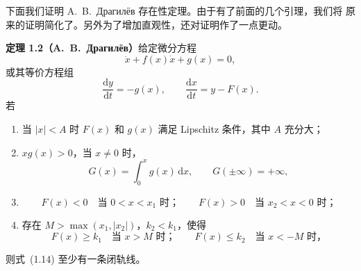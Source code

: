 下面我们证明 A.~B.~Драгилёв 存在性定理。由于有了前面的几个引理，我们将
原来的证明简化了。另外为了增加直观性，还对证明作了一点更动。

\noindent\textbf{定理 1.2（A.~B.~Драгилёв\cite{10}）}\quad 给定微分方程
\[
  \ddot{x}+f(x)\dot{x}+g(x)=0, \tag{1.13}
\]
或其等价方程组
\[
  \dfrac{\mathrm{d}y}{\mathrm{d}t}=-g(x),\qquad
  \dfrac{\mathrm{d}x}{\mathrm{d}t}=y-F(x). \tag{1.14}
\]
若
\begin{enumerate}
  \item 当 $|x|<A$ 时 $F(x)$ 和 $g(x)$ 满足 Lipschitz 条件，其中 $A$ 充分大；
  \item $xg(x)>0$，当 $x\ne0$ 时，
  \[
    G(x)=\int_0^xg(x)\,\mathrm{d}x,\qquad G(\pm\infty)=+\infty,
  \]
  \item
  \[
    F(x)<0\quad\text{当 }0<x<x_1\text{ 时；}\qquad
    F(x)>0\quad\text{当 }x_2<x<0\text{ 时；}
  \]
  \item 存在 $M>\max(x_1,|x_2|)$，$k_2<k_1$，使得
  \[
    F(x)\geq k_1\quad\text{当 }x>M\text{ 时；}\qquad
    F(x)\leq k_2\quad\text{当 }x<-M\text{ 时，}
  \]
\end{enumerate}
则式~(1.14) 至少有一条闭轨线。

